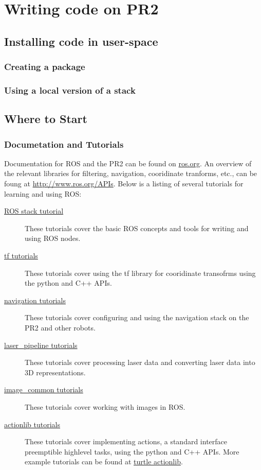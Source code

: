 \chapter{Writing code on PR2}
\section{Installing code in user-space}
\subsection{Creating a package}
\subsection{Using a local version of a stack}
\section{Where to Start}
\subsection{Documetation and Tutorials}
Documentation for ROS and the PR2 can be found on \href{http://www.ros.org}{ros.org}. An overview 
of the relevant libraries for filtering, navigation, cooridinate tranforms, etc., can be foung at 
\href{http://www.ros.org/APIs}{http://www.ros.org/APIs}. Below is a listing of several tutorials 
for learning and using ROS:
\begin{description}
\item[\href{http://www.ros.org/wiki/ROS/Tutorials}{ROS stack tutorial}] These tutorials cover the
basic ROS concepts and tools for writing and using ROS nodes.
\item[\href{http://www.ros.org/wiki/tf/Tutorials}{tf tutorials}] These tutorials cover using the tf 
library for cooridinate transofrms using the python and C++ APIs.
\item[\href{http://www.ros.org/wiki/navigation/Tutorials}{navigation tutorials}] These tutorials 
cover configuring and using the navigation stack on the PR2 and other robots.
\item[\href{http://www.ros.org/wiki/laser_pipeline/Tutorials}{laser\_pipeline tutorials}] These tutorials 
cover processing laser data and converting laser data into 3D representations.
\item[\href{http://www.ros.org/wiki/image_common/Tutorials}{image\_common tutorials}] These tutorials 
cover working with images in ROS.
\item[\href{http://www.ros.org/wiki/actionlib_tutorials/Tutorials}{actionlib tutorials}] These 
tutorials cover implementing actions, a standard interface preemptible highlevel tasks, using 
the python and C++ APIs. More example tutorials can be found at 
\href{http://www.ros.org/wiki/turtle_actionlib}{turtle actionlib}.
\end{description}


